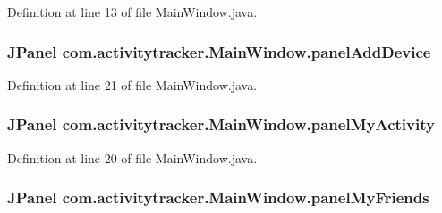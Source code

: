Definition at line 13 of file Main\+Window.\+java.

\subsubsection[{\texorpdfstring{panel\+Add\+Device}{panelAddDevice}}]{\setlength{\rightskip}{0pt plus 5cm}J\+Panel com.\+activitytracker.\+Main\+Window.\+panel\+Add\+Device\hspace{0.3cm}{\ttfamily [private]}}\hypertarget{classcom_1_1activitytracker_1_1_main_window_a02f203d3c00a61d838fcee4657984584}{}\label{classcom_1_1activitytracker_1_1_main_window_a02f203d3c00a61d838fcee4657984584}


Definition at line 21 of file Main\+Window.\+java.

\subsubsection[{\texorpdfstring{panel\+My\+Activity}{panelMyActivity}}]{\setlength{\rightskip}{0pt plus 5cm}J\+Panel com.\+activitytracker.\+Main\+Window.\+panel\+My\+Activity\hspace{0.3cm}{\ttfamily [private]}}\hypertarget{classcom_1_1activitytracker_1_1_main_window_a89833c824727a496f4a889177d4d3f3c}{}\label{classcom_1_1activitytracker_1_1_main_window_a89833c824727a496f4a889177d4d3f3c}


Definition at line 20 of file Main\+Window.\+java.

\subsubsection[{\texorpdfstring{panel\+My\+Friends}{panelMyFriends}}]{\setlength{\rightskip}{0pt plus 5cm}J\+Panel com.\+activitytracker.\+Main\+Window.\+panel\+My\+Friends\hspace{0.3cm}{\ttfamily [private]}}\hypertarget{classcom_1_1activitytracker_1_1_main_window_afc5efa70337b4b072b38c2cc30991473}{}\label{classcom_1_1activitytracker_1_1_main_window_afc5efa70337b4b072b38c2cc30991473}


